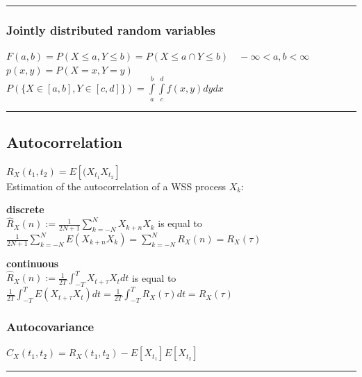 \vspace{2mm}
\hrule
\vspace{3mm}

\subsubsection{Jointly distributed random variables }
$F(a,b)=P(X \leq a, Y \leq b) = P(X \leq a \cap Y \leq b) \quad -\infty < a,b < \infty $\\
$p(x,y)=P(X=x, Y=y)$\\
$P(\{X \in [a,b], Y \in [c,d]\})= \int\limits_a^b \int\limits_c^d f(x,y)dy dx $

\vspace{2mm}
\hrule

\subsection{Autocorrelation}
	$\boxed{R_X(t_1,t_2)=E\left[(X_{t_1} X_{t_2}\right]}$\\
	\vspace{0.2cm}
	Estimation of the autocorrelation of a WSS process $X_k$:\\
\begin{minipage}{9cm}
	\textbf{discrete}	\\
	$\boxed{\hat{R}_X(n):=\frac{1}{2N+1} \displaystyle\sum_{k=-N}^{N}X_{k+n}X_k} $ is equal to\\
	$\boxed{\frac{1}{2N+1} \displaystyle\sum_{k=-N}^{N} E(X_{k+n}X_k) = \displaystyle\sum_{k=-N}^{N} R_X(n) = R_X(\tau)} $
\end{minipage}
\hspace{0.5cm}
\begin{minipage}{9cm}
	\textbf{continuous}	\\
	$\boxed{ \hat{R}_X(n):= \frac{1}{2T} \displaystyle\int_{-T}^T X_{t+\tau}X_t dt }$ is equal to\\
	$\boxed{ \frac{1}{2T} \displaystyle\int_{-T}^T E(X_{t+\tau}X_t)dt = \frac{1}{2T} \displaystyle\int_{-T}^T R_X(\tau) dt = R_X(\tau) }$
\end{minipage}

\subsubsection{Autocovariance}
$\boxed{C_X(t_1,t_2)=R_X(t_1,t_2)-E\left[X_{t_1} \right]E\left[X_{t_2}\right]}$

\vspace{2mm}
\hrule
\vspace{3mm}

